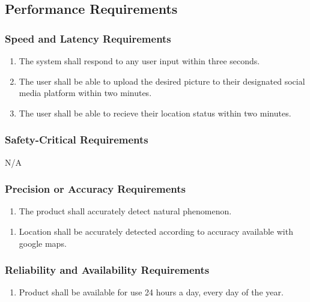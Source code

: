\documentclass[]{article}
\begin{document}

\subsection{Performance Requirements}
\label{sub:performance_requirements}

\subsubsection{Speed and Latency Requirements}
\label{ssub:speed_and_latency_requirements}
\begin{enumerate}[{PR}1. ]
	\item The system shall respond to any user input within three seconds.
	\item The user shall be able to upload the desired picture to their designated social media platform within two minutes.
	\item The user shall be able to recieve their location status within two minutes.
\end{enumerate}

\subsubsection{Safety-Critical Requirements}
\label{ssub:safety_critical_requirements}
N/A

\subsubsection{Precision or Accuracy Requirements}
\label{ssub:precision_or_accuracy_requirements}
\begin{enumerate}[{PR}4. ]
	\item The product shall accurately detect natural phenomenon.
	
\end{enumerate}
\begin{enumerate}[{PR}5. ]
	\item Location shall be accurately detected according to accuracy available with google maps.
\end{enumerate}

\subsubsection{Reliability and Availability Requirements}
\label{ssub:reliability_and_availability_requirements}
\begin{enumerate}[{PR}6. ]
	\item Product shall be available for use 24 hours a day, every day of the year.
\end{enumerate}
\end{document}
